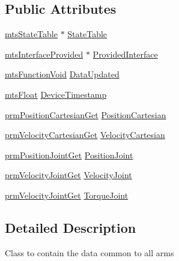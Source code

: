 \subsection*{Public Attributes}
\begin{DoxyCompactItemize}
\item 
\hyperlink{classmts_state_table}{mts\-State\-Table} $\ast$ \hyperlink{classmts_intuitive_da_vinci_1_1_arm_data_a46b59a678c5baaab10da5e4c7aaabe5e}{State\-Table}
\item 
\hyperlink{classmts_interface_provided}{mts\-Interface\-Provided} $\ast$ \hyperlink{classmts_intuitive_da_vinci_1_1_arm_data_a2e35a1f532d9d90100d6f58bad1ef7a0}{Provided\-Interface}
\item 
\hyperlink{classmts_function_void}{mts\-Function\-Void} \hyperlink{classmts_intuitive_da_vinci_1_1_arm_data_af71c6ee7db607fff0167e66926d6efea}{Data\-Updated}
\item 
\hyperlink{mts_generic_object_proxy_8h_a8750bcf116b87de6dedd90515e57eb6f}{mts\-Float} \hyperlink{classmts_intuitive_da_vinci_1_1_arm_data_a6318dd3fb2743ef06e676ea5e4e7a556}{Device\-Timestamp}
\item 
\hyperlink{classprm_position_cartesian_get}{prm\-Position\-Cartesian\-Get} \hyperlink{classmts_intuitive_da_vinci_1_1_arm_data_aa34441eee09790912bcee659dc805314}{Position\-Cartesian}
\item 
\hyperlink{classprm_velocity_cartesian_get}{prm\-Velocity\-Cartesian\-Get} \hyperlink{classmts_intuitive_da_vinci_1_1_arm_data_aa26ed3e13aeab62e1fdae9bd75ee170f}{Velocity\-Cartesian}
\item 
\hyperlink{classprm_position_joint_get}{prm\-Position\-Joint\-Get} \hyperlink{classmts_intuitive_da_vinci_1_1_arm_data_aa29266131113a857b0c972f804318dbd}{Position\-Joint}
\item 
\hyperlink{classprm_velocity_joint_get}{prm\-Velocity\-Joint\-Get} \hyperlink{classmts_intuitive_da_vinci_1_1_arm_data_a664aeae6730eb511571774698f962def}{Velocity\-Joint}
\item 
\hyperlink{classprm_velocity_joint_get}{prm\-Velocity\-Joint\-Get} \hyperlink{classmts_intuitive_da_vinci_1_1_arm_data_a2575a91719913cc0d8ce506c636fc9fa}{Torque\-Joint}
\end{DoxyCompactItemize}


\subsection{Detailed Description}
Class to contain the data common to all arms 

